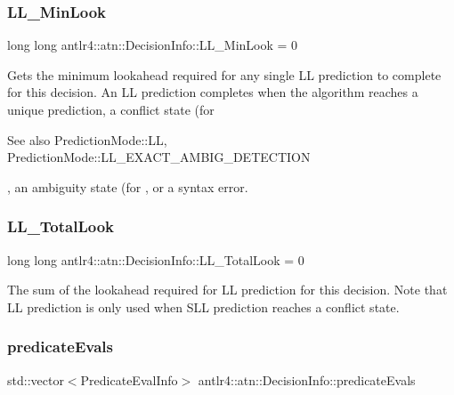 \subsubsection{\texorpdfstring{L\+L\+\_\+\+Min\+Look}{LL\_MinLook}}
{\footnotesize\ttfamily long long antlr4\+::atn\+::\+Decision\+Info\+::\+L\+L\+\_\+\+Min\+Look = 0}



Gets the minimum lookahead required for any single LL prediction to complete for this decision. An LL prediction completes when the algorithm reaches a unique prediction, a conflict state (for \begin{DoxySeeAlso}{See also}
Prediction\+Mode\+::\+LL, Prediction\+Mode\+::\+L\+L\+\_\+\+E\+X\+A\+C\+T\+\_\+\+A\+M\+B\+I\+G\+\_\+\+D\+E\+T\+E\+C\+T\+I\+ON


\end{DoxySeeAlso}
, an ambiguity state (for , or a syntax error. 

\mbox{\label{classantlr4_1_1atn_1_1DecisionInfo_a74ee8e588415c652036556738bdd2a04}} 
\subsubsection{\texorpdfstring{L\+L\+\_\+\+Total\+Look}{LL\_TotalLook}}
{\footnotesize\ttfamily long long antlr4\+::atn\+::\+Decision\+Info\+::\+L\+L\+\_\+\+Total\+Look = 0}



The sum of the lookahead required for LL prediction for this decision. Note that LL prediction is only used when S\+LL prediction reaches a conflict state. 

\mbox{\label{classantlr4_1_1atn_1_1DecisionInfo_aeedf6b569f2d3cd3902d0218a50526a1}} 
\subsubsection{\texorpdfstring{predicate\+Evals}{predicateEvals}}
{\footnotesize\ttfamily std\+::vector$<$Predicate\+Eval\+Info$>$ antlr4\+::atn\+::\+Decision\+Info\+::predicate\+Evals}



